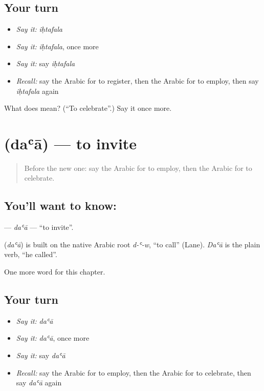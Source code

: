 \subsection*{Your turn}
\begin{itemize}
\raggedright
  \item \emph{Say it:} \emph{iḥtafala}
  \item \emph{Say it:} \emph{iḥtafala}, once more
  \item \emph{Say it:} say \emph{iḥtafala}
  \item \emph{Recall:} say the Arabic for to register, then the Arabic for to employ, then say \emph{iḥtafala} again
\end{itemize}

\begin{tcolorbox}[breakable,colback=teal!4,colframe=teal!35!black,title={Before you move on}]
What does  mean? (\textquotedblleft{}To celebrate\textquotedblright{}.) Say it once more.
\end{tcolorbox}
\section[\texorpdfstring{\ar{دعا} (daʿā)}{دعا (daʿā)}]{ (daʿā) — to invite}

\label{lesson:AR-C163-daa}



\begin{quote}
Before the new one: say the Arabic for to employ, then the Arabic for to celebrate.
\end{quote}

\subsection*{You'll want to know: }
\textbf{} — \emph{daʿā} — \textquotedblleft{}to invite\textquotedblright{}.

\begin{cousinweb}
\textbf{} (\emph{daʿā}) is built on the native Arabic root \emph{d-ʿ-w}, \textquotedblleft{}to call\textquotedblright{} (Lane). \emph{Daʿā} is the plain verb, \textquotedblleft{}he called\textquotedblright{}.
\end{cousinweb}

\begin{grammarlens}[title={What you've built}]
One more word for this chapter.
\end{grammarlens}

\subsection*{Your turn}
\begin{itemize}
\raggedright
  \item \emph{Say it:} \emph{daʿā}
  \item \emph{Say it:} \emph{daʿā}, once more
  \item \emph{Say it:} say \emph{daʿā}
  \item \emph{Recall:} say the Arabic for to employ, then the Arabic for to celebrate, then say \emph{daʿā} again
\end{itemize}

